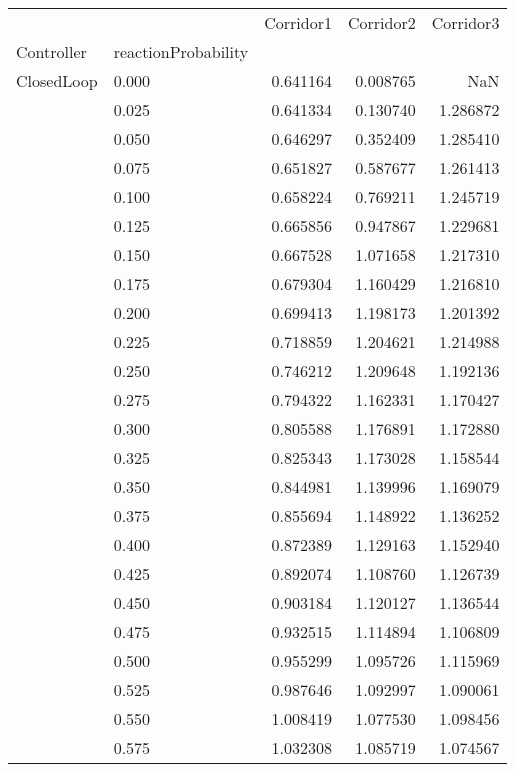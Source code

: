 \begin{tabular}{llrrr}
\toprule
         &       &  Corridor1 &  Corridor2 &  Corridor3 \\
Controller & reactionProbability &            &            &            \\
\midrule
ClosedLoop & 0.000 &   0.641164 &   0.008765 &        NaN \\
         & 0.025 &   0.641334 &   0.130740 &   1.286872 \\
         & 0.050 &   0.646297 &   0.352409 &   1.285410 \\
         & 0.075 &   0.651827 &   0.587677 &   1.261413 \\
         & 0.100 &   0.658224 &   0.769211 &   1.245719 \\
         & 0.125 &   0.665856 &   0.947867 &   1.229681 \\
         & 0.150 &   0.667528 &   1.071658 &   1.217310 \\
         & 0.175 &   0.679304 &   1.160429 &   1.216810 \\
         & 0.200 &   0.699413 &   1.198173 &   1.201392 \\
         & 0.225 &   0.718859 &   1.204621 &   1.214988 \\
         & 0.250 &   0.746212 &   1.209648 &   1.192136 \\
         & 0.275 &   0.794322 &   1.162331 &   1.170427 \\
         & 0.300 &   0.805588 &   1.176891 &   1.172880 \\
         & 0.325 &   0.825343 &   1.173028 &   1.158544 \\
         & 0.350 &   0.844981 &   1.139996 &   1.169079 \\
         & 0.375 &   0.855694 &   1.148922 &   1.136252 \\
         & 0.400 &   0.872389 &   1.129163 &   1.152940 \\
         & 0.425 &   0.892074 &   1.108760 &   1.126739 \\
         & 0.450 &   0.903184 &   1.120127 &   1.136544 \\
         & 0.475 &   0.932515 &   1.114894 &   1.106809 \\
         & 0.500 &   0.955299 &   1.095726 &   1.115969 \\
         & 0.525 &   0.987646 &   1.092997 &   1.090061 \\
         & 0.550 &   1.008419 &   1.077530 &   1.098456 \\
         & 0.575 &   1.032308 &   1.085719 &   1.074567 \\

\end{tabular}
